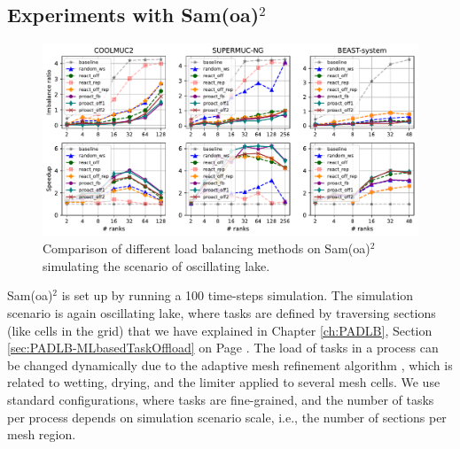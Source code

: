 \subsection{Experiments with Sam(oa)$^2$}
\label{subsec:exp_eval_lb_samoa}

\begin{figure}[t]
  \centering
  \includegraphics[scale=0.675]{./pictures/evaluation/eval_realistic_usecase_samoa_osc.pdf}
	\caption{Comparison of different load balancing methods on Sam(oa)$^2$ simulating the scenario of oscillating lake.}
	\label{fig:eval_samoa_osc}
\end{figure}

Sam(oa)$^2$ is set up by running a 100 time-steps simulation. The simulation scenario is again oscillating lake, where tasks are defined by traversing sections (like cells in the grid) that we have explained in Chapter \ref{ch:PADLB}, Section \ref{sec:PADLB-MLbasedTaskOffload} on Page \pageref{subsubsec:samoa-online-prediction}. The load of tasks in a process can be changed dynamically due to the adaptive mesh refinement algorithm \cite{rannabauer2018samoaaderdg}, which is related to wetting, drying, and the limiter applied to several mesh cells. We use standard configurations, where tasks are fine-grained, and the number of tasks per process depends on simulation scenario scale, i.e., the number of sections per mesh region. \\

